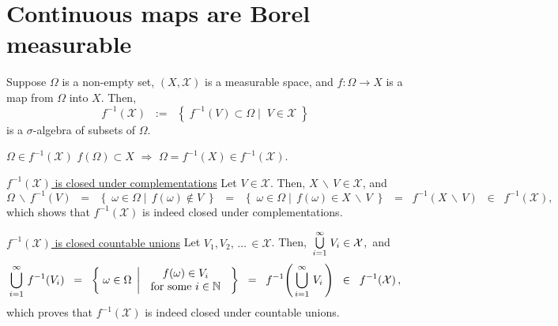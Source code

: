 

\section{Continuous maps are Borel measurable}
\setcounter{theorem}{0}
\setcounter{equation}{0}

\renewcommand{\theenumi}{\roman{enumi}}
\renewcommand{\labelenumi}{\textnormal{(\theenumi)}$\;\;$}

\begin{lemma}
\label{PreimagePreservesSigmaAlgebra}
\mbox{}\vskip 0.1cm
\noindent
Suppose $\Omega$ is a non-empty set, $(X,\mathcal{X})$
is a measurable space, and $f : \Omega \longrightarrow X$
is a map from $\Omega$ into $X$. Then,
\begin{equation*}
f^{-1}\!\left(\mathcal{X}\right)
\;\; := \;\;
\left\{\;
f^{-1}\!\left(V\right) \subset \Omega
\;\left\vert\;\;
V \in \mathcal{X}
\right.
\;\right\}
\end{equation*}
is a $\sigma$-algebra of subsets of $\Omega$.
\end{lemma}
\proof
\vskip 0.2cm
\noindent
\underline{$\Omega \in f^{-1}\!\left(\mathcal{X}\right)$}\quad
$f(\Omega) \subset X$ \;$\Longrightarrow$\; $\Omega = f^{-1}(X) \in f^{-1}\!\left(\mathcal{X}\right)$.

\vskip 0.5cm
\noindent
\underline{$f^{-1}\!\left(\mathcal{X}\right)$ is closed under complementations}\quad
Let $V \in \mathcal{X}$. Then, $X\,\backslash\,V \in \mathcal{X}$, and
\begin{equation*}
\Omega\,\backslash\,f^{-1}(V)
\;\; = \;\;
\left\{\;
\omega \in \Omega
\;\left\vert\;\,
f(\omega) \notin V
\right.
\;\right\}
\;\; = \;\;
\left\{\;
\omega \in \Omega
\;\left\vert\;\,
f(\omega) \in X\,\backslash\,V
\right.
\;\right\}
\;\; = \;\;
f^{-1}\!\left(X\,\backslash\,V\right)
\;\; \in \;\; f^{-1}\!\left(\mathcal{X}\right),
\end{equation*}
which shows that $f^{-1}\!\left(\mathcal{X}\right)$ is indeed closed under complementations.

\vskip 0.5cm
\noindent
\underline{$f^{-1}\!\left(\mathcal{X}\right)$ is closed countable unions}\quad
Let $V_{1}, V_{2}, \,\ldots\, \in \mathcal{X}$. Then,
\,$\overset{\infty}{\underset{i=1}{\textnormal{\large$\bigcup$}}}\;V_{i} \in \mathcal{X}$,\, and
\begin{equation*}
\bigcup_{i=1}^{\infty}\,f^{-1}\!\left(V_{i}\right)
\;\; = \;\;
\left\{\;
\omega \in \Omega
\;\left\vert\;\,
\begin{array}{c}
	f(\omega) \in V_{i} \\
	\textnormal{for some $i \in \mathbb{N}$}
\end{array}
\right.
\;\right\}
\;\; = \;\;
f^{-1}\!\left(\,\bigcup_{i=1}^{\infty}\,V_{i}\,\right)
\;\; \in \;\; f^{-1}\!\left(\mathcal{X}\right),
\end{equation*}
which proves that $f^{-1}\!\left(\mathcal{X}\right)$ is indeed closed under countable unions.

